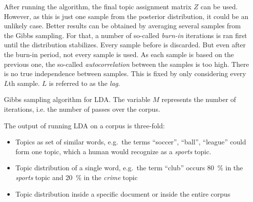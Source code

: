 \documentclass[
        a4paper,
        titlepage,
        twoside,
        parskip,
        numbers=noenddot
        ]{scrbook}
\theoremstyle{break}
\begin{document}
After running the algorithm, the final topic assignment matrix $Z$ can be used.
However, as this is just one sample from the posterior distribution, it could be an unlikely case.
Better results can be obtained by averaging several samples from the Gibbs sampling.
For that, a number of so-called \emph{burn-in} iterations is ran first until the distribution stabilizes.
Every sample before is discarded.
But even after the burn-in period, not every sample is used.
As each sample is based on the previous one, the so-called \emph{autocorrelation} between the samples is too high.
There is no true independence between samples.
This is fixed by only considering every $L$th sample.
$L$ is referred to as the \emph{lag}.

\begin{algorithm}
  \caption{Gibbs sampling algorithm for LDA. The variable $M$ represents the number of iterations, i.e. the number of passes over the corpus.}
  \label{alg:gibbs_sampling}
  \begin{algorithmic}[1]
        \EndFor
      \EndFor
    \EndFor
    \EndProcedure
  \end{algorithmic}
\end{algorithm}
\label{sec:lda}

The output of running LDA on a corpus is three-fold:
\begin{itemize}
  \item Topics as set of similar words, e.g.\ the terms ``soccer'', ``ball'', ``league'' could form one topic, which a human would recognize as a \emph{sports} topic.
  \item Topic distribution of a single word, e.g.\ the term ``club'' occurs 80~\% in the \emph{sports} topic and 20~\% in the \emph{crime} topic
  \item Topic distribution inside a specific document or inside the entire corpus
\end{itemize}
\end{document}
